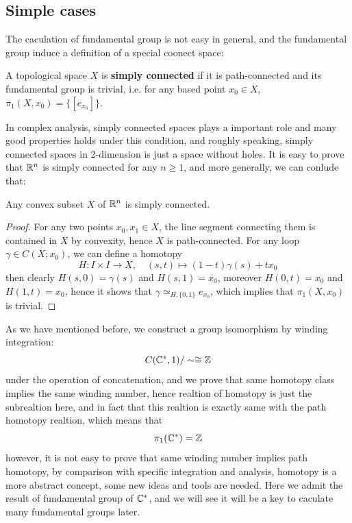 \documentclass[12pt,a4paper]{article}
\begin{document}
\subsection{Simple cases}

The caculation of fundamental group is not easy in general, and the fundamental group induce a definition of a special coonect space:
\begin{definitionplain}
    A topological space \(X\) is \textbf{simply connected} if it is path-connected and its fundamental group is trivial, i.e. for any based point \(x_0 \in X\), \(\pi_1(X,x_0) = \{[e_{x_0}]\}\).
\end{definitionplain}

In complex analysis, simply connected spaces plays a important role and many good properties holds under this condition, and roughly speaking, simply connected spaces in 2-dimension is just a space without holes. It is easy to prove that \(\mathbb{R}^n\) is simply connected for any \(n \geq 1\), and more generally, we can conlude that:
\begin{proposition}
    Any convex subset \(X\) of \(\mathbb{R}^n\) is simply connected.
\end{proposition}
\begin{proof}
    For any two points \(x_0,x_1 \in X\), the line segment connecting them is contained in \(X\) by convexity, hence \(X\) is path-connected. For any loop \(\gamma \in C(X;x_0)\), we can define a homotopy
    \[H:I \times I \to X, \quad (s,t) \mapsto (1-t)\gamma(s) + t x_0\]
    then clearly \(H(s,0) = \gamma(s)\) and \(H(s,1) = x_0\), moreover \(H(0,t) = x_0\) and \(H(1,t) = x_0\), hence it shows that \(\gamma \simeq_{H,\{0,1\}} e_{x_0}\), which implies that \(\pi_1(X,x_0)\) is trivial.
\end{proof}

As we have mentioned before, we construct a group isomorphism by winding integration:
\[C(\mathbb{C}^*,1)/\sim \cong \mathbb{Z}\]
under the operation of concatenation, and we prove that same homotopy class implies the same winding number, hence realtion of homotopy is just the subrealtion here, and in fact that this realtion is exactly same with the path homotopy realtion, which means that
\[\pi_1(\mathbb{C}^*) = \mathbb{Z}\]
however, it is not easy to prove that same winding number implies path homotopy, by comparison with specific integration and analysis, homotopy is a more abstract concept, some new ideas and tools are needed. Here we admit the result of fundamental group of \(\mathbb{C}^*\), and we will see it will be a key to caculate many fundamental groups later.
\end{document}
